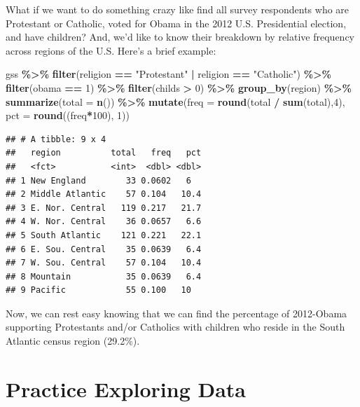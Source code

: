 \documentclass[
]{book}
\newenvironment{Shaded}{\begin{snugshade}}{\end{snugshade}}
\newcommand{\AttributeTok}[1]{\textcolor[rgb]{0.13,0.29,0.53}{#1}}
\newcommand{\DecValTok}[1]{\textcolor[rgb]{0.00,0.00,0.81}{#1}}
\newcommand{\FunctionTok}[1]{\textcolor[rgb]{0.13,0.29,0.53}{\textbf{#1}}}
\newcommand{\NormalTok}[1]{#1}
\newcommand{\SpecialCharTok}[1]{\textcolor[rgb]{0.81,0.36,0.00}{\textbf{#1}}}
\newcommand{\StringTok}[1]{\textcolor[rgb]{0.31,0.60,0.02}{#1}}
\begin{document}
What if we want to do something crazy like find all survey respondents who are Protestant or Catholic, voted for Obama in the 2012 U.S. Presidential election, and have children? And, we'd like to know their breakdown by relative frequency across regions of the U.S. Here's a brief example:

\begin{Shaded}
\begin{Highlighting}[]
\NormalTok{gss }\SpecialCharTok{\%\textgreater{}\%}
  \FunctionTok{filter}\NormalTok{(religion }\SpecialCharTok{==} \StringTok{"Protestant"} \SpecialCharTok{|}\NormalTok{ religion }\SpecialCharTok{==} \StringTok{"Catholic"}\NormalTok{) }\SpecialCharTok{\%\textgreater{}\%}
  \FunctionTok{filter}\NormalTok{(obama }\SpecialCharTok{==} \DecValTok{1}\NormalTok{) }\SpecialCharTok{\%\textgreater{}\%}
  \FunctionTok{filter}\NormalTok{(childs }\SpecialCharTok{\textgreater{}} \DecValTok{0}\NormalTok{) }\SpecialCharTok{\%\textgreater{}\%}
  \FunctionTok{group\_by}\NormalTok{(region) }\SpecialCharTok{\%\textgreater{}\%}
  \FunctionTok{summarize}\NormalTok{(}\AttributeTok{total =} \FunctionTok{n}\NormalTok{()) }\SpecialCharTok{\%\textgreater{}\%}
  \FunctionTok{mutate}\NormalTok{(}\AttributeTok{freq =} \FunctionTok{round}\NormalTok{(total }\SpecialCharTok{/} \FunctionTok{sum}\NormalTok{(total),}\DecValTok{4}\NormalTok{),}
         \AttributeTok{pct =} \FunctionTok{round}\NormalTok{((freq}\SpecialCharTok{*}\DecValTok{100}\NormalTok{), }\DecValTok{1}\NormalTok{))}
\end{Highlighting}
\end{Shaded}

\begin{verbatim}
## # A tibble: 9 x 4
##   region          total   freq   pct
##   <fct>           <int>  <dbl> <dbl>
## 1 New England        33 0.0602   6  
## 2 Middle Atlantic    57 0.104   10.4
## 3 E. Nor. Central   119 0.217   21.7
## 4 W. Nor. Central    36 0.0657   6.6
## 5 South Atlantic    121 0.221   22.1
## 6 E. Sou. Central    35 0.0639   6.4
## 7 W. Sou. Central    57 0.104   10.4
## 8 Mountain           35 0.0639   6.4
## 9 Pacific            55 0.100   10
\end{verbatim}

Now, we can rest easy knowing that we can find the percentage of 2012-Obama supporting Protestants and/or Catholics with children who reside in the South Atlantic census region (29.2\%).

\hypertarget{practice-exploring-data}{%
\section{Practice Exploring Data}\label{practice-exploring-data}}
\end{document}
